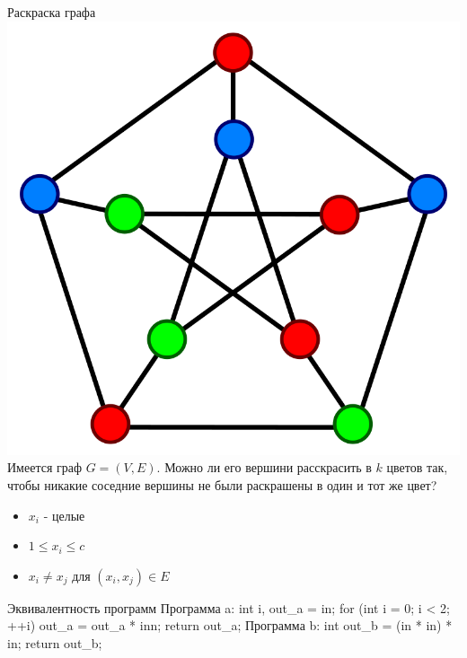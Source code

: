 \documentclass{beamer}
\begin{document}
\begin{frame}{Раскраска графа}
\includegraphics[scale=0.1]{graph-coloring.svg.png}
Имеется граф $G = (V, E)$. Можно ли его вершини расскрасить в $k$ цветов так, чтобы никакие соседние вершины не были раскрашены
в один и тот же цвет?\newline
\begin{itemize}
\item $x_i$ - целые
\item $1 \le x_i \le c$
\item $x_i \neq x_j$ для $(x_i, x_j) \in E$
\end{itemize}
\end{frame}

\begin{frame}{Эквивалентность программ}
Программа a:\newline
int i, out\_a = in;\newline
for (int i = 0; i < 2; ++i) out\_a = out\_a * inn;\newline
return out\_a;\newline
Программа b:\newline
int out\_b = (in * in) * in;\newline
return out\_b;
\end{frame}
\end{document}
